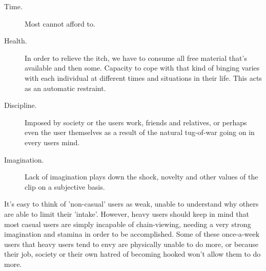 \documentclass[easypeasy]{subfiles}
\begin{document}
  \begin{description}
  \item [Time.] Most cannot afford to.
  \item [Health.] In order to relieve the itch, we have to consume all free material that's available and then some. Capacity to cope with that kind of binging varies with each individual at different times and situations in their life. This acts as an automatic restraint.
  \item [Discipline.] Imposed by society or the users work, friends and relatives, or perhaps even the user themselves as a result of the natural tug-of-war going on in every users mind.
  \item [Imagination.] Lack of imagination plays down the shock, novelty and other values of the clip on a subjective basis.
  \end{description}

It's easy to think of 'non-casual' users as weak, unable to understand why others are able to limit their 'intake'. However, heavy users should keep in mind that most casual users are simply incapable of chain-viewing, needing a very strong imagination and stamina in order to be accomplished. Some of these once-a-week users that heavy users tend to envy are physically unable to do more, or because their job, society or their own hatred of becoming hooked won't allow them to do more.
\end{document}
